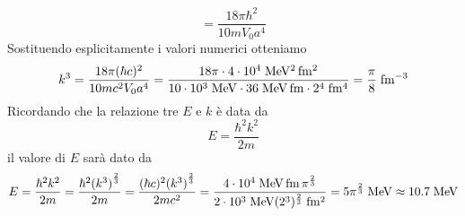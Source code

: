 \begin{soluzione}
\begin{equation*}
      =\frac{18 \pi \hbar^2}{10 m V_0 a^4}
   \end{equation*}
   Sostituendo esplicitamente i valori numerici otteniamo
   \begin{equation*}
      k^3
      =\frac{18 \pi (\hbar c)^2}{10 mc^2 V_0 a^4}
      =\rm \frac{18 \pi \cdot 4 \cdot 10^{4} \; MeV^2 \, fm^2}{10 \cdot 10^3 \; MeV \cdot 36 \; \rm MeV \, fm \cdot 2^4 \; fm^4}
      =\frac{\pi}{8} \; \rm fm^{-3}
   \end{equation*}
   Ricordando che la relazione tre $E$ e $k$ è data da
   \begin{equation*}
      E
      =\frac{\hbar^2 k^2}{2m}
   \end{equation*}
   il valore di $E$ sarà dato da
   \begin{equation*}
      E
      =\frac{\hbar^2 k^2}{2m}
      =\frac{\hbar^2 {(k^3)}^{\frac{2}{3}}}{2m}
      =\frac{(\hbar c)^2 {(k^3)}^{\frac{2}{3}}}{2 mc^2}
      =\rm \frac{4 \cdot 10^4 \; MeV \, fm \, \pi^{\frac{2}{3}}}{2 \cdot 10^3 \; MeV (2^3)^{\frac{2}{3}} \; fm^2}
      =5 \pi^{\frac{2}{3}} \; \rm MeV
      \approx 10.7 \; \rm MeV
   \end{equation*}
\end{soluzione}

\setcounter{equation}{0}
